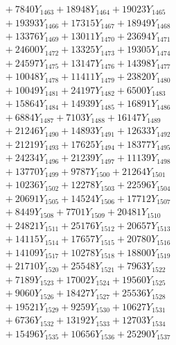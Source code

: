 \documentclass[a4paper,10pt]{article}
\begin{document}
{\begin{align}
&\;  + 7840 Y_{1463} + 18948 Y_{1464} + 19023 Y_{1465} \\[0.3ex]
&\;  + 19393 Y_{1466} + 17315 Y_{1467} + 18949 Y_{1468} \\[0.5ex]\allowbreak
&\;  + 13376 Y_{1469} + 13011 Y_{1470} + 23694 Y_{1471} \\[0.3ex]
&\;  + 24600 Y_{1472} + 13325 Y_{1473} + 19305 Y_{1474} \\[0.3ex]
&\;  + 24597 Y_{1475} + 13147 Y_{1476} + 14398 Y_{1477} \\[0.3ex]
&\;  + 10048 Y_{1478} + 11411 Y_{1479} + 23820 Y_{1480} \\[0.3ex]
&\;  + 10049 Y_{1481} + 24197 Y_{1482} + 6500 Y_{1483} \\[0.3ex]
&\;  + 15864 Y_{1484} + 14939 Y_{1485} + 16891 Y_{1486} \\[0.3ex]
&\;  + 6884 Y_{1487} + 7103 Y_{1488} + 16147 Y_{1489} \\[0.3ex]
&\;  + 21246 Y_{1490} + 14893 Y_{1491} + 12633 Y_{1492} \\[0.3ex]
&\;  + 21219 Y_{1493} + 17625 Y_{1494} + 18377 Y_{1495} \\[0.3ex]
&\;  + 24234 Y_{1496} + 21239 Y_{1497} + 11139 Y_{1498} \\[0.5ex]\allowbreak
&\;  + 13770 Y_{1499} + 9787 Y_{1500} + 21264 Y_{1501} \\[0.3ex]
&\;  + 10236 Y_{1502} + 12278 Y_{1503} + 22596 Y_{1504} \\[0.3ex]
&\;  + 20691 Y_{1505} + 14524 Y_{1506} + 17712 Y_{1507} \\[0.3ex]
&\;  + 8449 Y_{1508} + 7701 Y_{1509} + 20481 Y_{1510} \\[0.3ex]
&\;  + 24821 Y_{1511} + 25176 Y_{1512} + 20657 Y_{1513} \\[0.3ex]
&\;  + 14115 Y_{1514} + 17657 Y_{1515} + 20780 Y_{1516} \\[0.3ex]
&\;  + 14109 Y_{1517} + 10278 Y_{1518} + 18800 Y_{1519} \\[0.3ex]
&\;  + 21710 Y_{1520} + 25548 Y_{1521} + 7963 Y_{1522} \\[0.3ex]
&\;  + 7189 Y_{1523} + 17002 Y_{1524} + 19560 Y_{1525} \\[0.3ex]
&\;  + 9060 Y_{1526} + 18427 Y_{1527} + 25536 Y_{1528} \\[0.5ex]\allowbreak
&\;  + 19521 Y_{1529} + 9259 Y_{1530} + 10627 Y_{1531} \\[0.3ex]
&\;  + 6736 Y_{1532} + 13192 Y_{1533} + 12703 Y_{1534} \\[0.3ex]
&\;  + 15496 Y_{1535} + 10656 Y_{1536} + 25290 Y_{1537} \\[0.3ex]

\end{align}}
\end{document}
